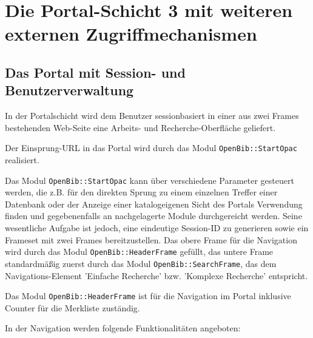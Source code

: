 \documentclass[11pt, twoside, a4paper, BCOR8mm, DIV12, bibtotoc,idxtotoc]{scrbook}
\begin{document}
\section{Die Portal-Schicht 3 mit weiteren externen Zugriffmechanismen}

\subsection{Das Portal mit Session- und Benutzerverwaltung}

In der Portalschicht wird dem Benutzer sessionbasiert in einer aus
zwei Frames bestehenden Web-Seite eine Arbeits- und Recherche-Oberfläche
geliefert. 

Der Einsprung-URL in das Portal wird durch das Modul
\texttt{OpenBib::StartOpac} realisiert.

Das Modul \texttt{OpenBib::StartOpac} kann über verschiedene
Parameter gesteuert werden, die z.B. für den direkten Sprung zu einem
einzelnen Treffer einer Datenbank oder der Anzeige einer
katalogeigenen Sicht des Portals Verwendung finden und gegebenenfalls
an nachgelagerte Module durchgereicht werden. Seine wesentliche
Aufgabe ist jedoch, eine eindeutige Session-ID zu generieren sowie ein
Frameset mit zwei Frames bereitzustellen.  Das obere Frame für die
Navigation wird durch das Modul \texttt{OpenBib::HeaderFrame}
gefüllt, das untere Frame standardmäßig zuerst durch das Modul
\texttt{OpenBib::SearchFrame}, das dem Navigations-Element 'Einfache
Recherche' bzw. 'Komplexe Recherche' entspricht.

Das Modul \texttt{OpenBib::HeaderFrame} ist für die Navigation im Portal
inklusive Counter für die Merkliste zuständig.

In der Navigation werden folgende Funktionalitäten angeboten:
\end{document}
